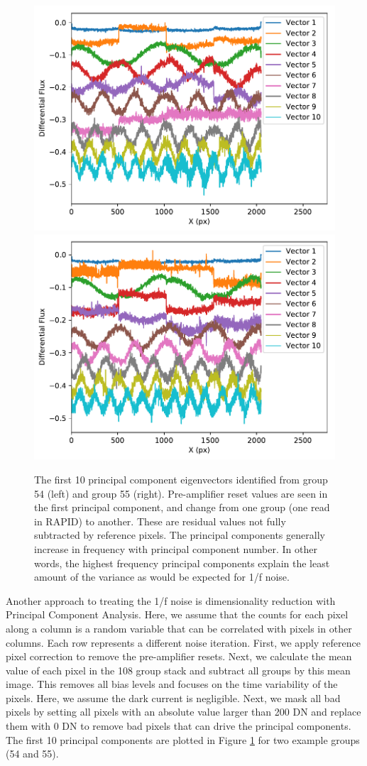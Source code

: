 \documentclass[]{aastex62}
\begin{document}
\begin{figure}[!hbtp]
\centering
\includegraphics[width=.4\columnwidth]{pca_dark_amp_all_extra_bias_sub_grp_54.pdf}
\includegraphics[width=.4\columnwidth]{pca_dark_amp_all_extra_bias_sub_grp_55.pdf}
\caption{The first 10 principal component eigenvectors identified from group 54 (left) and group 55 (right).
Pre-amplifier reset values are seen in the first principal component, and change from one group (one read in RAPID) to another.
These are residual values not fully subtracted by reference pixels.
The principal components generally increase in frequency with principal component number.
In other words, the highest frequency principal components explain the least amount of the variance as would be expected for 1/f noise.
}\label{fig:pcaEigenvectors}
\end{figure}

Another approach to treating the 1/f noise is dimensionality reduction with Principal Component Analysis.
Here, we assume that the counts for each pixel along a column is a random variable that can be correlated with pixels in other columns.
Each row represents a different noise iteration.
First, we apply reference pixel correction to remove the pre-amplifier resets.
Next, we calculate the mean value of each pixel in the 108 group stack and subtract all groups by this mean image.
This removes all bias levels and focuses on the time variability of the pixels.
Here, we assume the dark current is negligible.
Next, we mask all bad pixels by setting all pixels with an absolute value larger than 200 DN and replace them with 0 DN to remove bad pixels that can drive the principal components.
The first 10 principal components are plotted in Figure \ref{fig:pcaEigenvectors} for two example groups (54 and 55).
\end{document}

